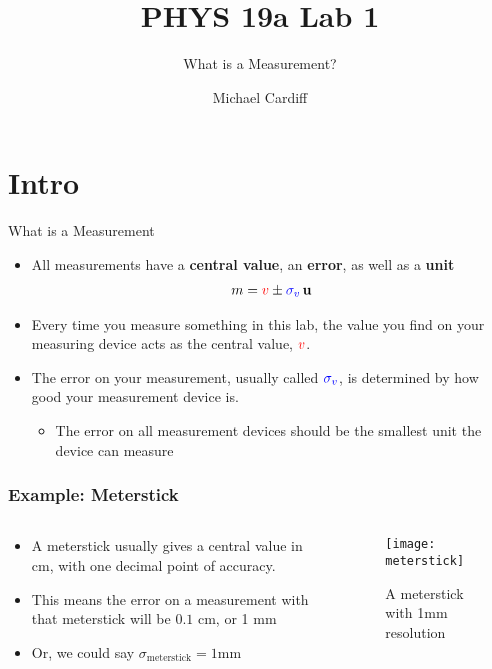 \documentclass[aspectratio=169]{beamer}
\title{PHYS 19a Lab 1}
\author{Michael Cardiff}
\subtitle{What is a Measurement?}
\begin{document}
\begin{frame}
  \titlepage
\end{frame}

\section{Intro}
\begin{frame}{What is a Measurement}
  \begin{itemize}
  \item All measurements have a {\color{red}\textbf{central value}}, an {\color{blue}\textbf{error}}, as well as a \textbf{unit}
    \begin{align*}
      m={\color{red}v}\pm{\color{blue}\sigma_v}\,\mathbf{u}
    \end{align*}
  \item Every time you measure something in this lab, the value you find on your measuring device acts as the central value, ${\color{red}v}$.
  \item The error on your measurement, usually called ${\color{blue}\sigma_v}$, is determined by how good your measurement device is.
    \begin{itemize}
    \item The error on all measurement devices should be the smallest unit the device can measure
    \end{itemize}
  \end{itemize}
\end{frame}

\begin{frame}
  \frametitle{Example: Meterstick}
  \begin{columns}
    \begin{column}{0.5\textwidth}
      \begin{itemize}
      \item A meterstick usually gives a central value in cm, with one decimal point of accuracy.
      \item This means the error on a measurement with that meterstick will be $0.1$ cm, or 1 mm
      \item Or, we could say $\sigma_{\text{meterstick}}=1$mm
      \end{itemize}
    \end{column}
    \begin{column}{0.5\textwidth}
      \begin{figure}[H]
        \centering
        \texttt{[image: meterstick]}
        \caption{A meterstick with 1mm resolution}
      \end{figure}
    \end{column}
  \end{columns}
\end{frame}
\end{document}
